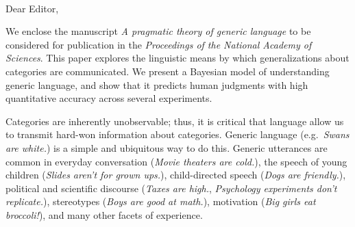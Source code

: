 \documentclass[11pt,letterpaper]{letter} %
\def\opening#1{\thispagestyle{empty}
{\centering\fromaddress \vspace{0.6in} \\ %
\hspace*{\longindentation}\hspace*{\fill}\par} %
\vspace{0.4in} %
\noindent #1 %
}
\begin{document}

\begin{letter}






\opening{Dear Editor,}


We enclose the manuscript \emph{A pragmatic theory of generic language} to be considered for publication in the \emph{Proceedings of the National Academy of Sciences}. 
This paper explores the linguistic means by which generalizations about categories are communicated.  
We present a Bayesian model of understanding generic language, and show that it predicts human judgments with high quantitative accuracy across several experiments.


Categories are inherently unobservable; thus, it is critical that language allow us to transmit hard-won information about categories. Generic language (e.g.~\emph{Swans are white.}) is a simple and ubiquitous way to do this. 
Generic utterances are common in everyday conversation (\emph{Movie theaters are cold.}), the speech of young children (\emph{Slides aren't for grown ups.}), child-directed speech (\emph{Dogs are friendly.}), political and scientific discourse (\emph{Taxes are high.}, \emph{Psychology experiments don't replicate.}), stereotypes (\emph{Boys are good at math.}), motivation (\emph{Big girls eat broccoli!}), and many other facets of experience.


\end{letter}
\end{document}
